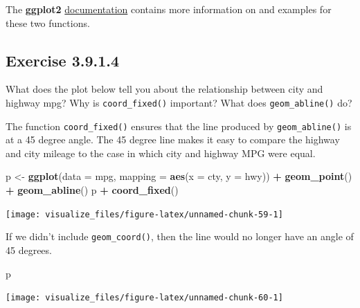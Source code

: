 \documentclass[]{book}
\newenvironment{Shaded}{\begin{snugshade}}{\end{snugshade}}
\newcommand{\DataTypeTok}[1]{\textcolor[rgb]{0.13,0.29,0.53}{#1}}
\newcommand{\KeywordTok}[1]{\textcolor[rgb]{0.13,0.29,0.53}{\textbf{#1}}}
\newcommand{\NormalTok}[1]{#1}
\newcommand{\OperatorTok}[1]{\textcolor[rgb]{0.81,0.36,0.00}{\textbf{#1}}}
\newcommand{\StringTok}[1]{\textcolor[rgb]{0.31,0.60,0.02}{#1}}
\theoremstyle{plain}
\theoremstyle{remark}
\begin{document}
The \textbf{ggplot2} \href{https://ggplot2.tidyverse.org/reference/coord_map.html}{documentation}
contains more information on and examples for these two functions.

\hypertarget{exercise-3.9.1.4}{%
\subsection*{\texorpdfstring{Exercise {3.9.1.4}}{Exercise 3.9.1.4}}\label{exercise-3.9.1.4}}

What does the plot below tell you about the relationship between city and highway mpg? Why is \texttt{coord\_fixed()} important?
What does \texttt{geom\_abline()} do?

The function \texttt{coord\_fixed()} ensures that the line produced by \texttt{geom\_abline()} is at a 45 degree angle.
The 45 degree line makes it easy to compare the highway and city mileage to the case in which city and highway MPG were equal.

\begin{Shaded}
\begin{Highlighting}[]
\NormalTok{p <-}\StringTok{ }\KeywordTok{ggplot}\NormalTok{(}\DataTypeTok{data =}\NormalTok{ mpg, }\DataTypeTok{mapping =} \KeywordTok{aes}\NormalTok{(}\DataTypeTok{x =}\NormalTok{ cty, }\DataTypeTok{y =}\NormalTok{ hwy)) }\OperatorTok{+}
\StringTok{  }\KeywordTok{geom_point}\NormalTok{() }\OperatorTok{+}
\StringTok{  }\KeywordTok{geom_abline}\NormalTok{()}
\NormalTok{p }\OperatorTok{+}\StringTok{ }\KeywordTok{coord_fixed}\NormalTok{()}
\end{Highlighting}
\end{Shaded}

\begin{center}\texttt{[image: visualize\_files/figure-latex/unnamed-chunk-59-1]} \end{center}

If we didn't include \texttt{geom\_coord()}, then the line would no longer have an angle of 45 degrees.

\begin{Shaded}
\begin{Highlighting}[]
\NormalTok{p}
\end{Highlighting}
\end{Shaded}

\begin{center}\texttt{[image: visualize\_files/figure-latex/unnamed-chunk-60-1]} \end{center}
\end{document}
